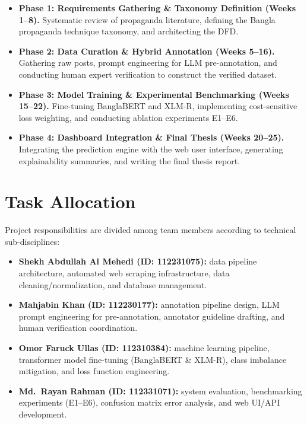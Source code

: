 \begin{itemize}
  \item \textbf{Phase 1: Requirements Gathering \& Taxonomy Definition (Weeks
        1--8).} Systematic review of propaganda literature, defining the Bangla
        propaganda technique taxonomy, and architecting the DFD.
  \item \textbf{Phase 2: Data Curation \& Hybrid Annotation (Weeks 5--16).}
        Gathering raw posts, prompt engineering for LLM pre-annotation, and
        conducting human expert verification to construct the verified dataset.
  \item \textbf{Phase 3: Model Training \& Experimental Benchmarking (Weeks
        15--22).} Fine-tuning BanglaBERT and XLM-R, implementing cost-sensitive
        loss weighting, and conducting ablation experiments E1--E6.
  \item \textbf{Phase 4: Dashboard Integration \& Final Thesis (Weeks 20--25).}
        Integrating the prediction engine with the web user interface, generating
        explainability summaries, and writing the final thesis report.
\end{itemize}

\section{Task Allocation}
\label{sec:tasks}
Project responsibilities are divided among team members according to technical
sub-disciplines:
\begin{itemize}
  \item \textbf{Shekh Abdullah Al Mehedi (ID: 112231075):} data pipeline
        architecture, automated web scraping infrastructure, data
        cleaning/normalization, and database management.
  \item \textbf{Mahjabin Khan (ID: 112230177):} annotation pipeline design, LLM
        prompt engineering for pre-annotation, annotator guideline drafting, and
        human verification coordination.
  \item \textbf{Omor Faruck Ullas (ID: 112310384):} machine learning pipeline,
        transformer model fine-tuning (BanglaBERT \& XLM-R), class imbalance
        mitigation, and loss function engineering.
  \item \textbf{Md.\ Rayan Rahman (ID: 112331071):} system evaluation, benchmarking
        experiments (E1--E6), confusion matrix error analysis, and web UI/API
        development.
\end{itemize}